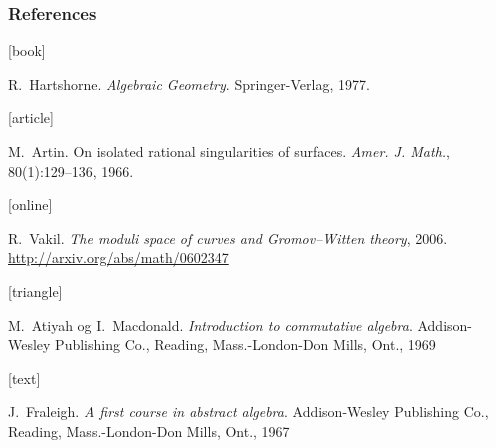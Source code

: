 \documentclass{beamer}
\begin{document}
\begin{frame}[allowframebreaks]
    \frametitle{References}

    \begin{thebibliography}{}

        [book]

        R.~Hartshorne.
        \newblock \emph{Algebraic Geometry}.
        \newblock Springer-Verlag, 1977.

        [article]

        M.~Artin.
        \newblock On isolated rational singularities of surfaces.
        \newblock \emph{Amer. J. Math.}, 80(1):129--136, 1966.

        [online]

        R.~Vakil.
        \newblock \emph{The moduli space of curves and Gromov--Witten theory}, 2006.
        \newblock \url{http://arxiv.org/abs/math/0602347}

        [triangle]

        M.~Atiyah og I.~Macdonald.
        \newblock \emph{Introduction to commutative algebra}.
        \newblock Addison-Wesley Publishing Co., Reading, Mass.-London-Don
        Mills, Ont., 1969

        [text]

        J.~Fraleigh.
        \newblock \emph{A first course in abstract algebra}.
        \newblock Addison-Wesley Publishing Co., Reading, Mass.-London-Don Mills, Ont., 1967

    \end{thebibliography}
\end{frame}
\end{document}
